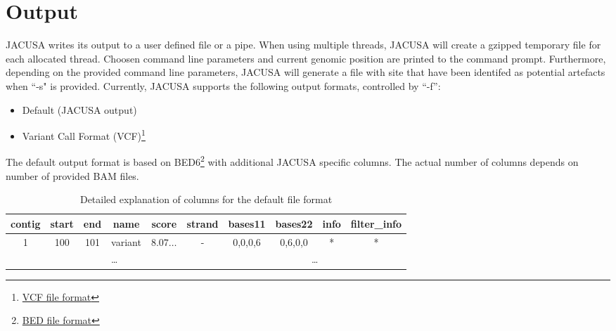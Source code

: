 \documentclass[12pt, a4paper]{article}
\begin{document}
\section{Output}
JACUSA writes its output to a user defined file or a pipe. When using multiple threads, JACUSA will
create a gzipped temporary file for each allocated thread. Choosen command line parameters
and current genomic position are printed to the command prompt. Furthermore, depending on
the provided command line parameters, JACUSA will generate a file with site that have been
identifed as potential artefacts when ``-s" is provided. Currently, JACUSA supports the following
output formats, controlled by ``-f'':
\begin{itemize}
  \item Default (JACUSA output)
  \item Variant Call Format
  (VCF)\footnote{\href{http://samtools.github.io/hts-specs/VCFv4.1.pdf]}{VCF file format}}
\end{itemize}
The default output format is based on
BED6\footnote{\href{http://genome.ucsc.edu/FAQ/FAQformat.html\#format1}{BED file format}} with
additional JACUSA specific columns. The actual number of columns depends on number of provided BAM
files.
\begin{table}
\caption{Detailed explanation of columns for the default file format}
\begin{tabular}{cccccc|cccc}
contig & start & end & name & score & strand & bases11 & bases22 & info & filter\_info \\
\hline
1 & 100 & 101 & variant & $8.07\ldots$ & - & 0,0,0,6 & 0,6,0,0 & * & * \\	
\multicolumn{6}{c}{\ldots} & \multicolumn{4}{c}{\ldots}
\end{tabular}
\end{table}
\end{document}
